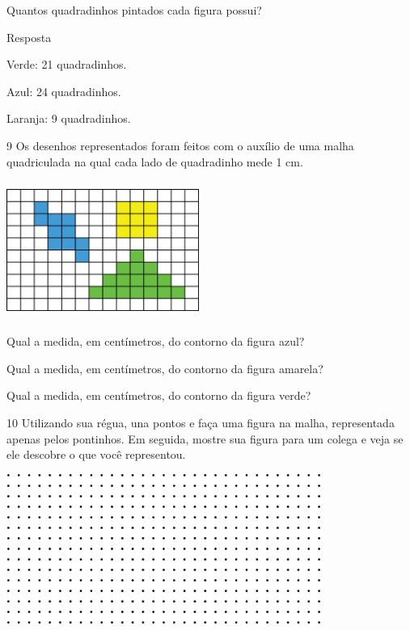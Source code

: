 \begin{escolha}
Quantos quadradinhos pintados cada figura possui?


Resposta

Verde: 21 quadradinhos.

Azul: 24 quadradinhos.

Laranja: 9 quadradinhos.

\num{9} Os desenhos representados foram feitos com o auxílio de uma malha
quadriculada na qual cada lado de quadradinho mede 1 cm.


\includegraphics[width=2.47521in,height=1.77515in]{media/image57.png}

\begin{escolha}

\item
  Qual a medida, em centímetros, do contorno da figura azul?
\coment{18 cm}

\item
  Qual a medida, em centímetros, do contorno da figura amarela?
\coment{12 cm}

\item
  Qual a medida, em centímetros, do contorno da figura verde?
\coment{22 cm}

\end{escolha}

\num{10} Utilizando sua régua, una pontos e faça uma figura na malha, representada apenas pelos pontinhos. Em seguida, mostre sua
figura para um colega e veja se ele descobre o que você representou.


\includegraphics[width=4.05869in,height=1.93350in]{media/image58.png}


\end{escolha}
